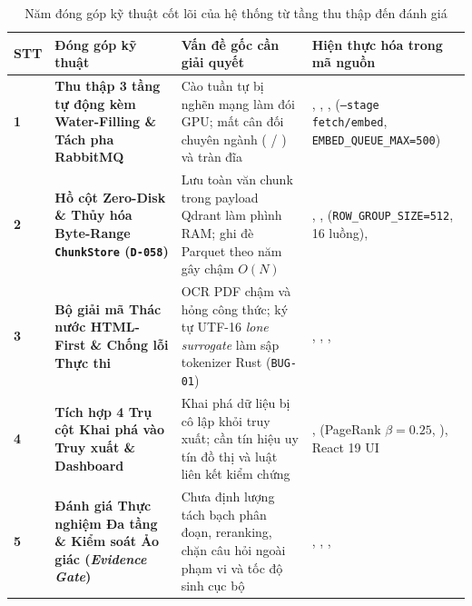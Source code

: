 \begin{table}[htbp]
  \centering
  \small
  \caption[Năm đóng góp kỹ thuật cốt lõi của hệ thống]{Năm đóng góp kỹ thuật cốt lõi của hệ thống từ tầng thu thập đến đánh giá}
  \label{tab:ch1_contributions}
  \setlength{\tabcolsep}{3.5pt}
  \begin{tabularx}{\linewidth}{|>{\centering\arraybackslash}p{8mm}|>{\raggedright\arraybackslash}p{40mm}|>{\raggedright\arraybackslash}p{45mm}|L|}
    \hline
    \textbf{STT} & \textbf{Đóng góp kỹ thuật} & \textbf{Vấn đề gốc cần giải quyết} & \textbf{Hiện thực hóa trong mã nguồn} \\
    \hline
    \textbf{1} & \textbf{Thu thập 3 tầng tự động kèm Water-Filling \& Tách pha RabbitMQ} & Cào tuần tự bị nghẽn mạng làm đói GPU; mất cân đối chuyên ngành ( / ) và tràn đĩa & , , ,  (\texttt{--stage fetch/embed}, \texttt{EMBED\_QUEUE\_MAX=500}) \\
    \hline
    \textbf{2} & \textbf{Hồ cột Zero-Disk \& Thủy hóa Byte-Range \texttt{ChunkStore} (\texttt{D-058})} & Lưu toàn văn chunk trong payload Qdrant làm phình RAM; ghi đè Parquet theo năm gây chậm $O(N)$ & , ,  (\texttt{ROW\_GROUP\_SIZE=512}, 16 luồng),  \\
    \hline
    \textbf{3} & \textbf{Bộ giải mã Thác nước HTML-First \& Chống lỗi Thực thi} & OCR PDF chậm và hỏng công thức; ký tự UTF-16 \textit{lone surrogate} làm sập tokenizer Rust (\texttt{BUG-01}) & , , ,  \\
    \hline
    \textbf{4} & \textbf{Tích hợp 4 Trụ cột Khai phá vào Truy xuất \& Dashboard} & Khai phá dữ liệu bị cô lập khỏi truy xuất; cần tín hiệu uy tín đồ thị và luật liên kết kiểm chứng & ,  (PageRank $\beta=0.25$, ), React 19 UI \\
    \hline
    \textbf{5} & \textbf{Đánh giá Thực nghiệm Đa tầng \& Kiểm soát Ảo giác (\textit{Evidence Gate})} & Chưa định lượng tách bạch phân đoạn, reranking, chặn câu hỏi ngoài phạm vi và tốc độ sinh cục bộ & , , ,  \\
    \hline
  \end{tabularx}
\end{table}

